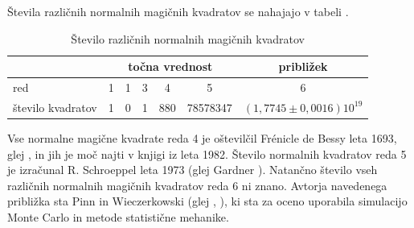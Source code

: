 \documentclass[a4paper,12pt]{article}
\begin{document}
Števila različnih normalnih magičnih kvadratov se nahajajo v tabeli .
\begin{table}[!ht]
\centering
\caption{Število različnih normalnih magičnih kvadratov}
\label{table:stevila}
\begin{tabular}{lcccccc}\toprule
   & \multicolumn{5}{c}{točna vrednost} & približek \\ 
   \midrule
   red & 1 & 1 & 3 & 4 & 5 & 6 \\
   število kvadratov & 1 & 0 & 1 & 880 & 78578347 & \((1{,}7745 \pm 0{,}0016)10^{19}\) \\
   \bottomrule
\end{tabular}
\end{table}


Vse normalne magične kvadrate reda 4 je oštevilčil Frénicle de Bessy
leta 1693, glej \cite{bessy}, in jih je moč najti v knjigi
iz leta 1982. Število normalnih kvadratov reda 5 je izračunal
R. Schroeppel leta 1973 (glej Gardner \cite{berlekamp}).
Natančno število vseh različnih normalnih magičnih kvadratov reda 6 ni znano.
Avtorja navedenega približka sta Pinn in Wieczerkowski (glej \cite{gardner}, \cite{pinn}), ki
sta za oceno uporabila simulacijo Monte Carlo in metode statistične mehanike.


\newpage




\end{document}

